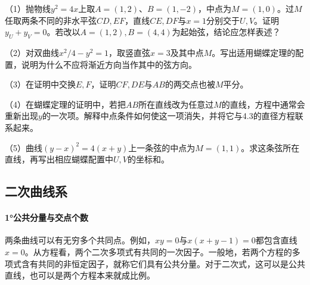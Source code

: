 \begin{exercise}
\mbox{}\par\nobreak

\begin{samepage}
（1）抛物线\(y^2=4x\)上取\(A=(1,2)\)、\(B=(1,-2)\)，中点为\(M=(1,0)\)。过\(M\)任取两条不同的非水平弦\(CD,EF\)，直线\(CE,DF\)与\(x=1\)分别交于\(U,V\)。证明\(y_U+y_V=0\)。若改以\(A=(1,2),B=(4,4)\)为起始弦，结论应怎样表述？
\par
\end{samepage}

\begin{samepage}
（2）对双曲线\(x^2/4-y^2=1\)，取竖直弦\(x=3\)及其中点\(M\)。写出适用蝴蝶定理的配置，说明为什么不应将渐近方向当作其中的弦方向。
\par
\end{samepage}

\begin{samepage}
（3）在证明中交换\(E,F\)，证明\(CF,DE\)与\(AB\)的两交点也被\(M\)平分。
\par
\end{samepage}

\begin{samepage}
（4）在蝴蝶定理的证明中，若把\(AB\)所在直线改为任意过\(M\)的直线，方程中通常会重新出现\(y\)的一次项。解释中点条件如何使这一项消失，并将它与4.3的直径方程联系起来。
\par
\end{samepage}


\begin{samepage}
（5）曲线\((y-x)^2=4(x+y)\)上一条弦的中点为\(M=(1,1)\)。求这条弦所在直线，再写出相应蝴蝶配置中\(U,V\)的坐标和。
\par
\end{samepage}

\end{exercise}

\newpage
\subsection{二次曲线系}
\label{subsec:quadratic-conic-families}

\begingroup
\setlength{\parskip}{2pt}
\paragraph{1°公共分量与交点个数} \mbox{}

两条曲线可以有无穷多个共同点。例如，\(xy=0\)与\(x(x+y-1)=0\)都包含直线\(x=0\)。从方程看，两个二次多项式有共同的一次因子。一般地，若两个方程的多项式含有共同的非恒定因子，就称它们具有{\heiti{}公共分量}。对于二次式，这可以是公共直线，也可以是两个方程本来就成比例。

